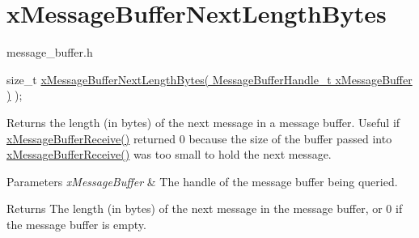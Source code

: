 \hypertarget{group__xMessageBufferNextLengthBytes}{}\section{x\+Message\+Buffer\+Next\+Length\+Bytes}
\label{group__xMessageBufferNextLengthBytes}
message\+\_\+buffer.\+h 
\begin{DoxyPre}
size\_t \hyperlink{message__buffer_8h_ae2b56b6564cf2476891394231a31ecad}{xMessageBufferNextLengthBytes( MessageBufferHandle\_t xMessageBuffer )} );
\end{DoxyPre}
 Returns the length (in bytes) of the next message in a message buffer. Useful if \hyperlink{message__buffer_8h_af12a227ba511a95cbea5aa81c7f3ba12}{x\+Message\+Buffer\+Receive()} returned 0 because the size of the buffer passed into \hyperlink{message__buffer_8h_af12a227ba511a95cbea5aa81c7f3ba12}{x\+Message\+Buffer\+Receive()} was too small to hold the next message.


\begin{DoxyParams}{Parameters}
{\em x\+Message\+Buffer} & The handle of the message buffer being queried.\\
\hline
\end{DoxyParams}
\begin{DoxyReturn}{Returns}
The length (in bytes) of the next message in the message buffer, or 0 if the message buffer is empty. 
\end{DoxyReturn}
